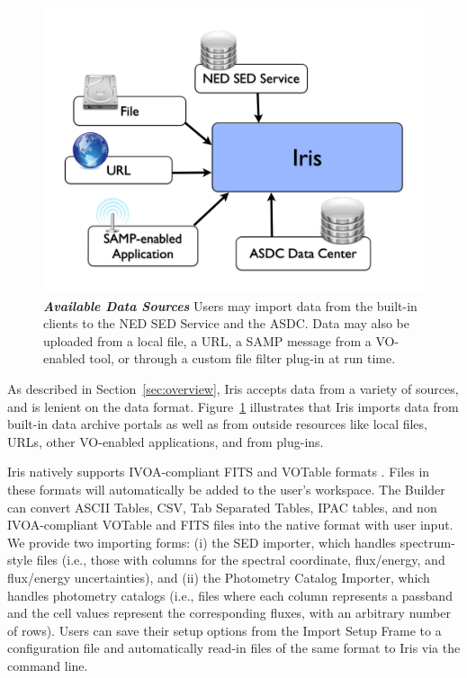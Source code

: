 \documentclass[final,5p,authoryear]{elsarticle}
\begin{document}
\begin{figure} \begin{center}
\includegraphics[width=\columnwidth]{figures/IrisDiagrams.002.png}
\caption{\textit{\textbf{\label{fig:data_sources} Available Data
Sources}}\textit{}\textbf{}\textit{} Users may import data from the built-in
clients to the NED SED Service and the ASDC. Data may also be uploaded from 
a local file, a URL, a SAMP message from a VO-enabled tool, 
or through a custom file filter plug-in at run time.} \end{center}
\end{figure}

As described in Section~\ref{sec:overview}, Iris accepts data from a variety of
sources, and is lenient on the data format. Figure~\ref{fig:data_sources}
illustrates that Iris imports data from built-in data archive portals as well as
from outside resources like local files, URLs, other VO-enabled applications,
and from plug-ins.

Iris natively supports IVOA-compliant FITS and VOTable formats
\citep{2012arXiv1204.3055M}. Files in these formats will automatically be added
to the user's workspace. The Builder can convert ASCII Tables, CSV,
Tab Separated Tables, IPAC tables, and non IVOA-com\-pli\-ant VOTable and FITS files
into the native format with user input. We provide two importing forms: (i) the
SED importer, which handles spectrum-style files (i.e., those with columns for
the spectral coordinate, flux/energy, and flux/energy uncertainties), and (ii)
the Photometry Catalog Importer, which handles photometry catalogs (i.e., files
where each column represents a passband and the cell values represent the
corresponding fluxes, with an arbitrary number of rows). Users can save their
setup options from the Import Setup Frame to a configuration file and
automatically read-in files of the same format to Iris via the command line.
\end{document}
